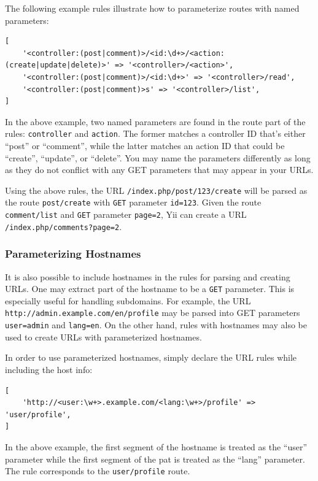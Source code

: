 The following example rules illustrate how to parameterize routes with named parameters:

\lstset{language=php}\begin{lstlisting}
[
    '<controller:(post|comment)>/<id:\d+>/<action:(create|update|delete)>' => '<controller>/<action>',
    '<controller:(post|comment)>/<id:\d+>' => '<controller>/read',
    '<controller:(post|comment)>s' => '<controller>/list',
]
\end{lstlisting}
In the above example, two named parameters are found in the route part of the rules: \lstinline|controller| and \lstinline|action|. The former matches a controller ID that's either ``post'' or ``comment'', while the latter matches an action ID that could be ``create'', ``update'', or ``delete''. You may name the parameters differently as long as they do not conflict with any GET parameters that may appear in your URLs.

Using the above rules, the URL \lstinline|/index.php/post/123/create| will be parsed as the route \lstinline|post/create| with \lstinline|GET| parameter
\lstinline|id=123|. Given the route \lstinline|comment/list| and \lstinline|GET| parameter \lstinline|page=2|, Yii can create a URL \lstinline|/index.php/comments?page=2|.

\subsubsection{Parameterizing Hostnames}
It is also possible to include hostnames in the rules for parsing and creating URLs. One may extract part of the hostname
to be a \lstinline|GET| parameter. This is especially useful for handling subdomains. For example, the URL
\lstinline|http://admin.example.com/en/profile| may be parsed into GET parameters \lstinline|user=admin| and \lstinline|lang=en|. On the other hand,
rules with hostnames may also be used to create URLs with parameterized hostnames.

In order to use parameterized hostnames, simply declare the URL rules while including the host info:

\lstset{language=php}\begin{lstlisting}
[
    'http://<user:\w+>.example.com/<lang:\w+>/profile' => 'user/profile',
]
\end{lstlisting}
In the above example, the first segment of the hostname is treated as the ``user'' parameter while the first segment
of the pat is treated as the ``lang'' parameter. The rule corresponds to the \lstinline|user/profile| route.

